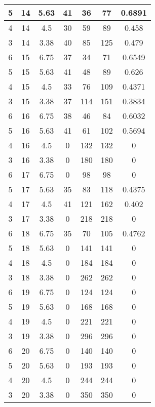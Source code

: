 \documentclass[letterpaper, 12pt]{article}
\begin{document}
\begin{longtable}{|c|c|c|c|c|c|c|}
\hline
5 & 14 & 5.63 & 41 & 36 & 77 & 0.6891 \\
\hline
4 & 14 & 4.5 & 30 & 59 & 89 & 0.458 \\
\hline
3 & 14 & 3.38 & 40 & 85 & 125 & 0.479 \\
\hline
6 & 15 & 6.75 & 37 & 34 & 71 & 0.6549 \\
\hline
5 & 15 & 5.63 & 41 & 48 & 89 & 0.626 \\
\hline
4 & 15 & 4.5 & 33 & 76 & 109 & 0.4371 \\
\hline
3 & 15 & 3.38 & 37 & 114 & 151 & 0.3834 \\
\hline
6 & 16 & 6.75 & 38 & 46 & 84 & 0.6032 \\
\hline
5 & 16 & 5.63 & 41 & 61 & 102 & 0.5694 \\
\hline
4 & 16 & 4.5 & 0 & 132 & 132 & 0 \\
\hline
3 & 16 & 3.38 & 0 & 180 & 180 & 0 \\
\hline
6 & 17 & 6.75 & 0 & 98 & 98 & 0 \\
\hline
5 & 17 & 5.63 & 35 & 83 & 118 & 0.4375 \\
\hline
4 & 17 & 4.5 & 41 & 121 & 162 & 0.402 \\
\hline
3 & 17 & 3.38 & 0 & 218 & 218 & 0 \\
\hline
6 & 18 & 6.75 & 35 & 70 & 105 & 0.4762 \\
\hline
5 & 18 & 5.63 & 0 & 141 & 141 & 0 \\
\hline
4 & 18 & 4.5 & 0 & 184 & 184 & 0 \\
\hline
3 & 18 & 3.38 & 0 & 262 & 262 & 0 \\
\hline
6 & 19 & 6.75 & 0 & 124 & 124 & 0 \\
\hline
5 & 19 & 5.63 & 0 & 168 & 168 & 0 \\
\hline
4 & 19 & 4.5 & 0 & 221 & 221 & 0 \\
\hline
3 & 19 & 3.38 & 0 & 296 & 296 & 0 \\
\hline
6 & 20 & 6.75 & 0 & 140 & 140 & 0 \\
\hline
5 & 20 & 5.63 & 0 & 193 & 193 & 0 \\
\hline
4 & 20 & 4.5 & 0 & 244 & 244 & 0 \\
\hline
3 & 20 & 3.38 & 0 & 350 & 350 & 0 \\
\hline
\end{longtable}
\end{document}
